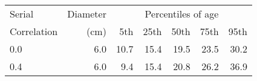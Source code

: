 \begin{tabular}{|l|r||r|r|r|r|r|}
\hline
Serial       & Diameter   & \multicolumn{5}{c|}{Percentiles of age} \\
Correlation  & (cm)       & 5th & 25th & 50th & 75th & 95th \\
\hline
0.0 & 6.0 & 10.7  & 15.4  & 19.5  & 23.5  & 30.2 \\
0.4 & 6.0 & 9.4  & 15.4  & 20.8  & 26.2  & 36.9 \\
\hline
\end{tabular}
